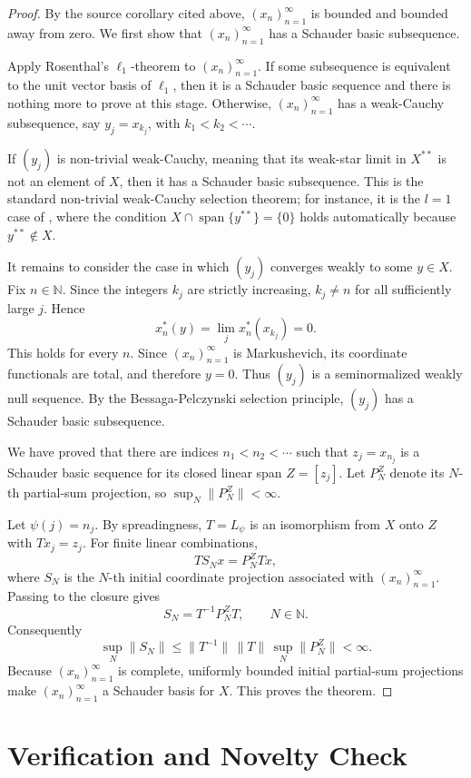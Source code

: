 \documentclass[11pt]{article}
\newcommand{\N}{\mathbb N}
\newcommand{\xb}{(x_n)_{n=1}^{\infty}}
\begin{document}
\begin{proof}
By the source corollary cited above, \(\xb\) is bounded and bounded away from
zero. We first show that \(\xb\) has a Schauder basic subsequence.

Apply Rosenthal's \(\ell_1\)-theorem to \(\xb\). If some subsequence is
equivalent to the unit vector basis of \(\ell_1\), then it is a Schauder basic
sequence and there is nothing more to prove at this stage. Otherwise, \(\xb\)
has a weak-Cauchy subsequence, say \(y_j=x_{k_j}\), with \(k_1<k_2<\cdots\).

If \((y_j)\) is non-trivial weak-Cauchy, meaning that its weak-star limit in
\(X^{**}\) is not an element of \(X\), then it has a Schauder basic subsequence.
This is the standard non-trivial weak-Cauchy selection theorem; for instance,
it is the \(l=1\) case of \cite[Proposition 2.4]{AGLM}, where the condition
\(X\cap \operatorname{span}\{y^{**}\}=\{0\}\) holds automatically because
\(y^{**}\notin X\).

It remains to consider the case in which \((y_j)\) converges weakly to some
\(y\in X\). Fix \(n\in\N\). Since the integers \(k_j\) are strictly increasing,
\(k_j\ne n\) for all sufficiently large \(j\). Hence
\[
        x_n^*(y)=\lim_j x_n^*(x_{k_j})=0.
\]
This holds for every \(n\). Since \(\xb\) is Markushevich, its coordinate
functionals are total, and therefore \(y=0\). Thus \((y_j)\) is a
seminormalized weakly null sequence. By the Bessaga-Pelczynski selection
principle, \((y_j)\) has a Schauder basic subsequence.

We have proved that there are indices \(n_1<n_2<\cdots\) such that
\(z_j=x_{n_j}\) is a Schauder basic sequence for its closed linear span
\(Z=[z_j]\). Let \(P_N^Z\) denote its \(N\)-th partial-sum projection, so
\(\sup_N\|P_N^Z\|<\infty\).

Let \(\psi(j)=n_j\). By spreadingness, \(T=L_\psi\) is an isomorphism from
\(X\) onto \(Z\) with \(T x_j=z_j\). For finite linear combinations,
\[
        T S_N x = P_N^Z T x,
\]
where \(S_N\) is the \(N\)-th initial coordinate projection associated with
\(\xb\). Passing to the closure gives
\[
        S_N = T^{-1} P_N^Z T,\qquad N\in\N.
\]
Consequently
\[
        \sup_N \|S_N\|
        \le \|T^{-1}\|\,\|T\|\,\sup_N\|P_N^Z\| <\infty.
\]
Because \(\xb\) is complete, uniformly bounded initial partial-sum projections
make \(\xb\) a Schauder basis for \(X\). This proves the theorem.
\end{proof}

\section*{Verification and Novelty Check}
\end{document}
